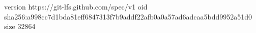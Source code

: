 version https://git-lfs.github.com/spec/v1
oid sha256:a998cc7d1bda81eff6847313f7b9addf22afb0a0a57ad6adcaa5bdd9952a51d0
size 32864
